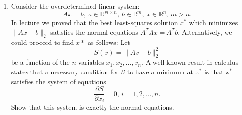 \documentclass{article}
\newcommand{\twonorm}[1]{\| #1 \|_2}
\newcommand{\rdim}[2]{\mathbb{R}^{#1 \times #2}}
\begin{document}
\thispagestyle{fancy}
\begin{enumerate}
  \item Consider the overdetermined linear system:
  \[ Ax = b,\: a \in \rdim{m}{n}, \; b \in \mathbb{R}^m,\: x \in \mathbb{R}^n, \: m > n.\]
  In lecture we proved that the best least-squares solution $x^*$ which minimizes $\twonorm{Ax-b}$ satisfies the normal equations $A^TAx=A^Tb$. Alternatively, we could proceed to find $x*$ as follows: Let
  \[ S(x) = \twonorm{Ax - b}^2 \]
  be a function of the $n$ variables $x_1,x_2,\dots,x_n$. A well-known result in calculus states that a necessary condition for $S$ to have a minimum at $x^*$ is that $x^*$ satisfies the system of equations
  \[ \frac{\partial S}{\partial x_i} = 0, \: i = 1,2,\dots,n.\]
  Show that this system is exactly the normal equations.
  

\end{enumerate}
\end{document}
